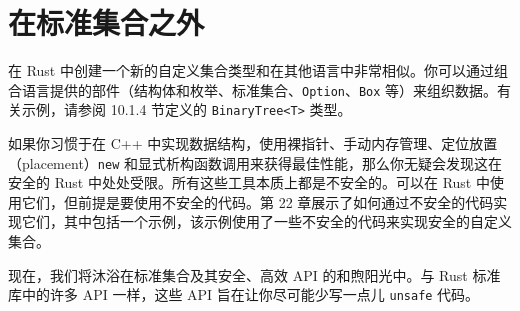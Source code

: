 \section{在标准集合之外}

在 Rust 中创建一个新的自定义集合类型和在其他语言中非常相似。你可以通过组合语言提供的部件（结构体和枚举、标准集合、\texttt{Option}、\texttt{Box} 等）来组织数据。有关示例，请参阅 10.1.4 节定义的 \texttt{BinaryTree<T>} 类型。

如果你习惯于在 C++ 中实现数据结构，使用裸指针、手动内存管理、定位放置（placement）\texttt{new} 和显式析构函数调用来获得最佳性能，那么你无疑会发现这在安全的 Rust 中处处受限。所有这些工具本质上都是不安全的。可以在 Rust 中使用它们，但前提是要使用不安全的代码。第 22 章展示了如何通过不安全的代码实现它们，其中包括一个示例，该示例使用了一些不安全的代码来实现安全的自定义集合。

现在，我们将沐浴在标准集合及其安全、高效 API 的和煦阳光中。与 Rust 标准库中的许多 API 一样，这些 API 旨在让你尽可能少写一点儿 \texttt{unsafe} 代码。

